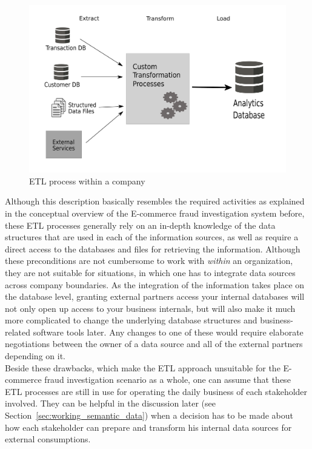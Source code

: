 \begin{figure}[H]
  \centering
  \includegraphics[width=0.9\columnwidth]{images/etl_process.pdf}
  \caption[ETL process within a company]{\gls{ETL} process within a company \citep[pg. 165]{wood2014linked}}
\label{fig:images_etl_process}
\end{figure}

Although this description basically resembles the required activities as explained in the conceptual overview of the \gls{E-commerce} fraud investigation system before, these \gls{ETL} processes generally rely on an in-depth knowledge of the data structures that are used in each of the information sources, as well as require a direct access to the databases and files for retrieving the information. Although these preconditions are not cumbersome to work with \emph{within} an organization, they are not suitable for situations, in which one has to integrate data sources across company boundaries. As the integration of the information takes place on the database level, granting external partners access your internal databases will not only open up access to your business internals, but will also make it much more complicated to change the underlying database structures and business-related software tools later. Any changes to one of these would require elaborate negotiations between the owner of a data source and all of the external partners depending on it. \\

Beside these drawbacks, which make the \gls{ETL} approach unsuitable for the \gls{E-commerce} fraud investigation scenario as a whole, one can assume that these \gls{ETL} processes are still in use for operating the daily business of each stakeholder involved. They can be helpful in the discussion later (see Section~\ref{sec:working_semantic_data}) when a decision has to be made about how each stakeholder can prepare and transform his internal data sources for external consumptions.


